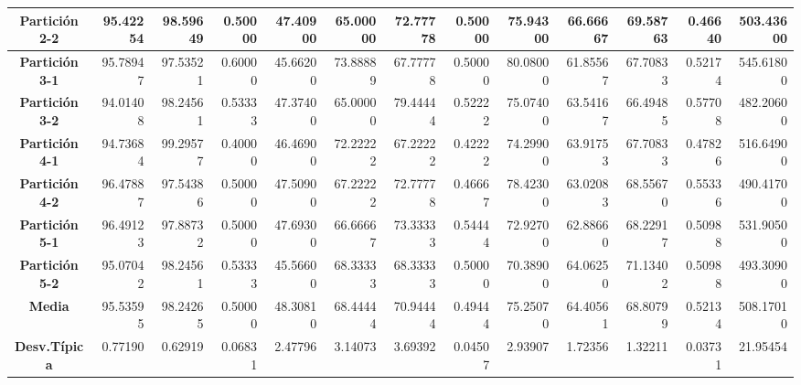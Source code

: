 \documentclass[a4paper,11pt]{article}
\begin{document}
\begin{table}[H]
\begin{adjustbox}{width=1.1\textwidth}
\begin{tabular}{|c|r|r|r|r|r|r|r|r|r|r|r|r|}
  \textbf{Partición 2-2} & 95.42254 & 98.59649 & 0.50000 & 47.40900 & 65.00000 & 72.77778 & 0.50000 & 75.94300 & 66.66667 & 69.58763 & 0.46640 & 503.43600 \\ \hline
  \textbf{Partición 3-1} & 95.78947 & 97.53521 & 0.60000 & 45.66200 & 73.88889 & 67.77778 & 0.50000 & 80.08000 & 61.85567 & 67.70833 & 0.52174 & 545.61800 \\ \hline
  \textbf{Partición 3-2} & 94.01408 & 98.24561 & 0.53333 & 47.37400 & 65.00000 & 79.44444 & 0.52222 & 75.07400 & 63.54167 & 66.49485 & 0.57708 & 482.20600 \\ \hline
  \textbf{Partición 4-1} & 94.73684 & 99.29577 & 0.40000 & 46.46900 & 72.22222 & 67.22222 & 0.42222 & 74.29900 & 63.91753 & 67.70833 & 0.47826 & 516.64900 \\ \hline
  \textbf{Partición 4-2} & 96.47887 & 97.54386 & 0.50000 & 47.50900 & 67.22222 & 72.77778 & 0.46667 & 78.42300 & 63.02083 & 68.55670 & 0.55336 & 490.41700 \\ \hline
  \textbf{Partición 5-1} & 96.49123 & 97.88732 & 0.50000 & 47.69300 & 66.66667 & 73.33333 & 0.54444 & 72.92700 & 62.88660 & 68.22917 & 0.50988 & 531.90500 \\ \hline
  \textbf{Partición 5-2} & 95.07042 & 98.24561 & 0.53333 & 45.56600 & 68.33333 & 68.33333 & 0.50000 & 70.38900 & 64.06250 & 71.13402 & 0.50988 & 493.30900 \\ \hline
  \textbf{Media} & 95.53595 & 98.24265 & 0.50000 & 48.30810 & 68.44444 & 70.94444 & 0.49444 & 75.25070 & 64.40561 & 68.80799 & 0.52134 & 508.17010 \\ \hline
  \textbf{Desv.Típica} & 0.77190 & 0.62919 & 0.06831 & 2.47796 & 3.14073 & 3.69392 & 0.04507 & 2.93907 & 1.72356 & 1.32211 & 0.03731 & 21.95454 \\ \hline  \end{tabular}
  \end{adjustbox}
  \label{AGE}
  \end{table}
  
  
  
\end{document}
